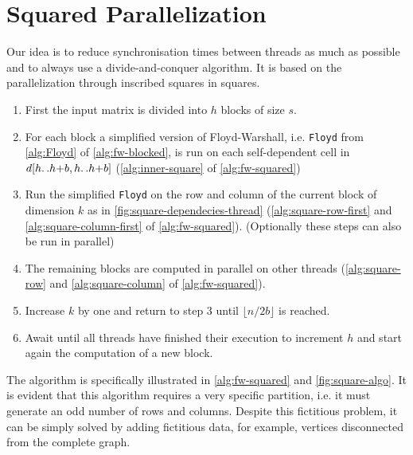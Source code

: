 \section{Squared Parallelization}\label{squared-parallelization}

Our idea is to reduce synchronisation times between threads as much as possible and to always use a divide-and-conquer algorithm. 
It is based on the parallelization through inscribed squares in squares.


\begin{enumerate}
    \item First the input matrix is divided into \(h\) blocks of size \(s\).
    \item For each block a simplified version of Floyd-Warshall, i.e. \texttt{Floyd} from \cref{alg:Floyd} of \cref{alg:fw-blocked}, is run on each self-dependent cell in \(d[h{\mathinner {\ldotp \ldotp}}h{+}b,h{\mathinner {\ldotp \ldotp}}h{+}b]\) (\cref{alg:inner-square} of \cref{alg:fw-squared}) 
    \item Run the simplified \texttt{Floyd} on the row and column of the current block of dimension \(k\) as in \cref{fig:square-dependecies-thread} (\cref{alg:square-row-first} and \ref{alg:square-column-first} of \cref{alg:fw-squared}). (Optionally these steps can also be run in parallel)
    \item The remaining blocks are computed in parallel on other threads (\cref{alg:square-row} and \ref{alg:square-column} of \cref{alg:fw-squared}).
    \item Increase \(k\) by one and return to step 3 until \(\lfloor n/2b \rfloor\) is reached.
    \item Await until all threads have finished their execution to increment \(h\) and start again the computation of a new block.
\end{enumerate}
The algorithm is specifically illustrated in \cref{alg:fw-squared} and \cref{fig:square-algo}.
It is evident that this algorithm requires a very specific partition, i.e. it must generate an odd number of rows and columns. 
Despite this fictitious problem, it can be simply solved by adding fictitious data, for example, vertices disconnected from the complete graph.
